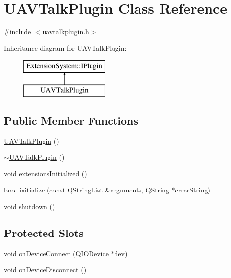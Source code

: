 \hypertarget{class_u_a_v_talk_plugin}{\section{\-U\-A\-V\-Talk\-Plugin \-Class \-Reference}
\label{class_u_a_v_talk_plugin}
}


{\ttfamily \#include $<$uavtalkplugin.\-h$>$}

\-Inheritance diagram for \-U\-A\-V\-Talk\-Plugin\-:\begin{figure}[H]
\begin{center}
\leavevmode
\includegraphics[height=2.000000cm]{class_u_a_v_talk_plugin}
\end{center}
\end{figure}
\subsection*{\-Public \-Member \-Functions}
\begin{DoxyCompactItemize}
\item 
\hyperlink{group___u_a_v_talk_plugin_ga140bdf803c218ccb2a6017a2a6aba95e}{\-U\-A\-V\-Talk\-Plugin} ()
\item 
\hyperlink{group___u_a_v_talk_plugin_gab4102ef2791ea82b9460336b06361158}{$\sim$\-U\-A\-V\-Talk\-Plugin} ()
\item 
\hyperlink{group___u_a_v_objects_plugin_ga444cf2ff3f0ecbe028adce838d373f5c}{void} \hyperlink{group___u_a_v_talk_plugin_ga2b7202eb07a1d037f8e92eeedbc1621e}{extensions\-Initialized} ()
\item 
bool \hyperlink{group___u_a_v_talk_plugin_ga311f58f272717ad544a6ca019a42f821}{initialize} (const \-Q\-String\-List \&arguments, \hyperlink{group___u_a_v_objects_plugin_gab9d252f49c333c94a72f97ce3105a32d}{\-Q\-String} $\ast$error\-String)
\item 
\hyperlink{group___u_a_v_objects_plugin_ga444cf2ff3f0ecbe028adce838d373f5c}{void} \hyperlink{group___u_a_v_talk_plugin_ga67b3b23618210b3dfbf43dc1b0fa03b1}{shutdown} ()
\end{DoxyCompactItemize}
\subsection*{\-Protected \-Slots}
\begin{DoxyCompactItemize}
\item 
\hyperlink{group___u_a_v_objects_plugin_ga444cf2ff3f0ecbe028adce838d373f5c}{void} \hyperlink{group___u_a_v_talk_plugin_ga496d6211736a7cfd5cee129eb2b8ad95}{on\-Device\-Connect} (\-Q\-I\-O\-Device $\ast$dev)
\item 
\hyperlink{group___u_a_v_objects_plugin_ga444cf2ff3f0ecbe028adce838d373f5c}{void} \hyperlink{group___u_a_v_talk_plugin_ga1ac9b2c0c21d66d603c639183ebcd7db}{on\-Device\-Disconnect} ()
\end{DoxyCompactItemize}



